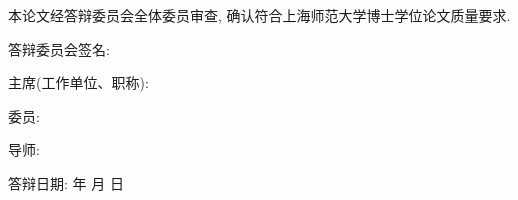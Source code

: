 \documentclass[a4paper,zihao=-4]{ctexart}
\begin{document}

\clearpage

\thispagestyle{empty}

\vspace*{-6pt}

{ 本论文经答辩委员会全体委员审查, 确认符合上海师范大学博士学位论文质量要求. }

\vspace{3.5cm}

{ 答辩委员会签名:}

\vspace{2cm}

{ 主席(工作单位、职称): }

\vspace{2cm}

{ 委员: }

\vspace{5.15cm}

{ 导师: }

\vskip 18pt

{ 答辩日期:  \quad \quad 年 \quad 月 \quad 日}
\end{document}
